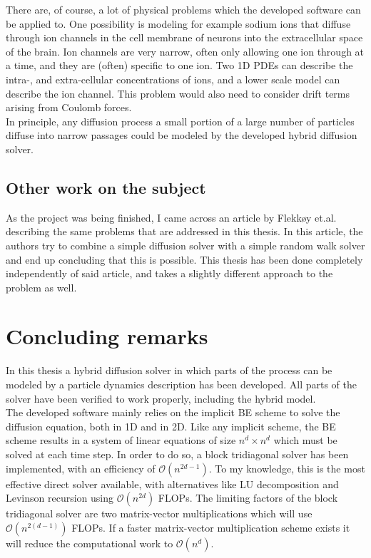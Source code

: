 There are, of course, a lot of physical problems which the developed software can be applied to. 
One possibility is modeling for example sodium ions that diffuse through ion channels in the cell membrane of neurons into the extracellular space of the brain. 
Ion channels are very narrow, often only allowing one ion through at a time, and they are (often) specific to one ion. 
Two 1D PDEs can describe the intra-, and extra-cellular concentrations of ions, and a lower scale model can describe the ion channel. 
This problem would also need to consider drift terms arising from Coulomb forces. \\

In principle, any diffusion process a small portion of a large number of particles diffuse into narrow passages could be modeled by the developed hybrid diffusion solver.

\subsection{Other work on the subject}

As the project was being finished, I came across an article by Flekkøy et.al.\cite{flekkoy2001coupling} describing the same problems that are addressed in this thesis. 
In this article, the authors try to combine a simple diffusion solver with a simple random walk solver and end up concluding that this is possible. 
This thesis has been done completely independently of said article, and takes a slightly different approach to the problem as well. \\



\section{Concluding remarks}

In this thesis a hybrid diffusion solver in which parts of the process can be modeled by a particle dynamics description has been developed. 
All parts of the solver have been verified to work properly, including the hybrid model. \\


The developed software mainly relies on the implicit BE scheme to solve the diffusion equation, both in 1D and in 2D. 
Like any implicit scheme, the BE scheme results in a system of linear equations of size $n^d\times n^d$ which must be solved at each time step. 
In order to do so, a block tridiagonal solver has been implemented, with an efficiency of $\mathcal{O}(n^{2d-1})$. 
To my knowledge, this is the most effective direct solver available, with alternatives like LU decomposition and Levinson recursion using $\mathcal{O}(n^{2d})$ FLOPs. 
The limiting factors of the block tridiagonal solver are two matrix-vector multiplications which will use $\mathcal{O}(n^{2(d-1)})$ FLOPs. 
If a faster matrix-vector multiplication scheme exists it will reduce the computational work to $\mathcal{O}(n^d)$. \\

